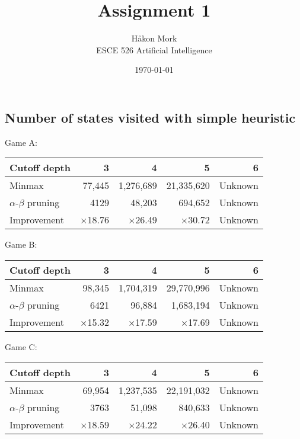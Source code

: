 \documentclass[letterpaper, 11pt]{article}
\title{\textbf{Assignment 1}}
\author{Håkon Mork \\ ESCE 526 Artificial Intelligence}
\date{\today}
\numberwithin{theorem}{section}
\begin{document}
\maketitle
\noindent

\section{}
\subsection{Number of states visited with simple heuristic}
Game A:
\begin{table}[h]
	\centering
	\small
	\begin{tabular}{lrrrr}
		Cutoff depth & 3 & 4 & 5 & 6 \\
		\midrule
		Minmax & 77,445 & 1,276,689 & 21,335,620 &  Unknown \\
		$\alpha$-$\beta$ pruning & 4129 & 48,203 & 694,652 & Unknown \\
		\midrule
		Improvement & $\times$18.76 & $\times$26.49 & $\times$30.72 & Unknown
	\end{tabular}
\end{table}

\noindent Game B:
\begin{table}[h]
	\centering
	\small
	\begin{tabular}{lrrrr}
		Cutoff depth & 3 & 4 & 5 & 6 \\
		\midrule
		Minmax & 98,345 & 1,704,319 & 29,770,996 & Unknown \\
		$\alpha$-$\beta$ pruning & 6421 & 96,884 & 1,683,194 & Unknown \\
		\midrule
		Improvement & $\times$15.32 & $\times$17.59 & $\times$17.69 & Unknown
	\end{tabular}
\end{table}

\noindent Game C:
\begin{table}[h]
	\centering
	\small
	\begin{tabular}{lrrrr}
		Cutoff depth & 3 & 4 & 5 & 6 \\
		\midrule
		Minmax & 69,954 & 1,237,535 & 22,191,032 & Unknown \\
		$\alpha$-$\beta$ pruning & 3763 & 51,098 & 840,633 & Unknown \\
		\midrule
		Improvement & $\times$18.59 & $\times$24.22 & $\times$26.40 & Unknown
	\end{tabular}
\end{table}
\end{document}
